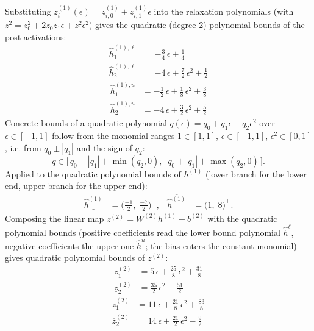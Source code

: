 \documentclass[11pt]{article}
\begin{document}
Substituting $z^{(1)}_i(\epsilon) = z^{(1)}_{i,0} + z^{(1)}_{i,1} \epsilon$ into the relaxation
polynomials (with $z^2 = z_0^2 + 2 z_0 z_1 \epsilon + z_1^2 \epsilon^2$) gives the quadratic
(degree-2) polynomial bounds of the post-activations:
\begin{align*}
\hat{h}^{(1),\ell}_{1} &= -\frac{3}{4}\,\epsilon + \frac{1}{4} \\
\hat{h}^{(1),\ell}_{2} &= -4\,\epsilon + \frac{7}{2}\,\epsilon^2 + \frac{1}{2}
\end{align*}
\begin{align*}
\hat{h}^{(1),u}_{1} &= -\frac{1}{2}\,\epsilon + \frac{1}{8}\,\epsilon^2 + \frac{3}{8} \\
\hat{h}^{(1),u}_{2} &= -4\,\epsilon + \frac{3}{2}\,\epsilon^2 + \frac{5}{2}
\end{align*}
Concrete bounds of a quadratic polynomial $q(\epsilon) = q_0 + q_1 \epsilon + q_2 \epsilon^2$ over
$\epsilon \in [-1, 1]$ follow from the monomial ranges $1 \in [1, 1]$, $\epsilon \in [-1, 1]$,
$\epsilon^2 \in [0, 1]$, i.e. from $q_0 \pm |q_1|$ and the sign of $q_2$:
\begin{equation*}
q \in \bigl[\, q_0 - |q_1| + \min(q_2, 0), \;\; q_0 + |q_1| + \max(q_2, 0) \,\bigr].
\end{equation*}
Applied to the quadratic polynomial bounds of $h^{(1)}$ (lower branch for the lower end, upper branch for the upper end):
\begin{align*}
\underline{\hat{h}^{(1)}} &= \bigl(\frac{-1}{2},\; \frac{-7}{2}\bigr)^{\!\top}, & \overline{\hat{h}^{(1)}} &= \bigl(1,\; 8\bigr)^{\!\top}.
\end{align*}
Composing the linear map $z^{(2)} = W^{(2)} h^{(1)} + b^{(2)}$ with the quadratic polynomial bounds
(positive coefficients read the lower bound polynomial $\hat{h}^{\ell}$, negative coefficients the
upper one $\hat{h}^{u}$; the bias enters the constant monomial) gives quadratic polynomial bounds of
$z^{(2)}$:
\begin{align*}
\underline{z}^{(2)}_{1} &= 5\,\epsilon + \frac{25}{8}\,\epsilon^2 + \frac{31}{8} \\
\underline{z}^{(2)}_{2} &= \frac{35}{2}\,\epsilon^2 - \frac{51}{2}
\end{align*}
\begin{align*}
\overline{z}^{(2)}_{1} &= 11\,\epsilon + \frac{21}{8}\,\epsilon^2 + \frac{83}{8} \\
\overline{z}^{(2)}_{2} &= 14\,\epsilon + \frac{21}{2}\,\epsilon^2 - \frac{9}{2}
\end{align*}
\end{document}
